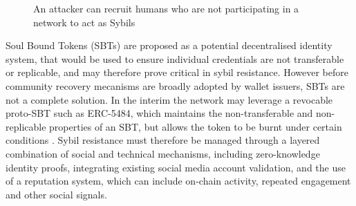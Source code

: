 \documentclass[11pt,a4paper]{article}
\begin{document}
\begin{figure}[H]
    \centering
    \caption{An attacker can recruit humans who are not participating in a network to act as Sybils}
    \label{fig:sybil-attack}
\end{figure}
\vspace{0.1cm}

Soul Bound Tokens (SBTs) are proposed as a potential decentralised identity system, that would be used to ensure individual credentials are not transferable or replicable, and may therefore prove critical in sybil resistance.
However before community recovery mecanisms are broadly adopted by wallet issuers, SBTs are not a complete solution.
In the interim the network may leverage a revocable proto-SBT such as ERC-5484, which maintains the non-transferable and non-replicable properties of an SBT, but allows the token to be burnt under certain conditions \cite{erc5484}.
Sybil resistance must therefore be managed through a layered combination of social and technical mechanisms, including zero-knowledge identity proofs, integrating existing social media account validation, and the use of a reputation system, which can include on-chain activity, repeated engagement and other social signals.
\end{document}
